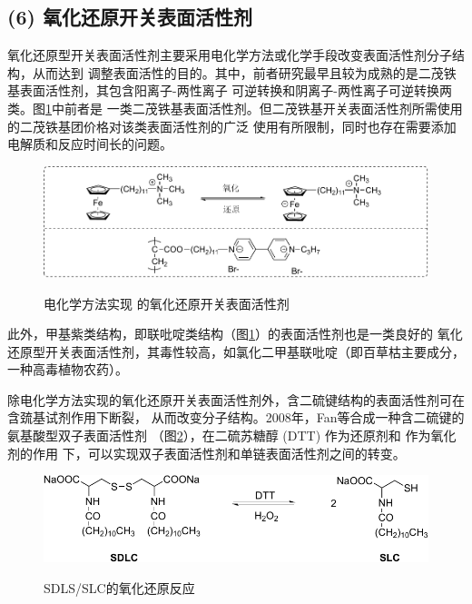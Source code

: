 \documentclass[bachelor,winfonts,replaceperiod]{jnuthesis}
\begin{document}
    \subsection*{(6) 氧化还原开关表面活性剂}
    氧化还原型开关表面活性剂主要采用电化学方法或化学手段改变表面活性剂分子结构，从而达到
    调整表面活性的目的。其中，前者研究最早且较为成熟的是二茂铁基表面活性剂，其包含阳离子-两性离子
    可逆转换和阴离子-两性离子可逆转换两类\cite{李云霞2011}。图\ref{fig:switchable-redox-cp2fe}中前者是
    一类二茂铁基表面活性剂。但二茂铁基开关表面活性剂所需使用的二茂铁基团价格对该类表面活性剂的广泛
    使用有所限制，同时也存在需要添加电解质和反应时间长的问题。
    \begin{figure}[htbp]
        \centering
        \includegraphics[scale=0.8]{Figure/switchable-cp2fe.pdf}\\
        \caption{电化学方法实现 的氧化还原开关表面活性剂}\label{fig:switchable-redox-cp2fe}
    \end{figure}
    
    此外，甲基紫类结构，即联吡啶类结构（图\ref{fig:switchable-redox-cp2fe}）的表面活性剂也是一类良好的
    氧化还原型开关表面活性剂，其毒性较高，如氯化二甲基联吡啶（即百草枯主要成分，一种高毒植物农药）。
    
    除电化学方法实现的氧化还原开关表面活性剂外，含二硫键结构的表面活性剂可在含巯基试剂作用下断裂，
    从而改变分子结构。2008年，Fan等\cite{fan2008}合成一种含二硫键的氨基酸型双子表面活性剂
    （图\ref{fig:switchable-redox-disulfide}），在二硫苏糖醇 (DTT) 作为还原剂和  作为氧化剂的作用
    下，可以实现双子表面活性剂和单链表面活性剂之间的转变。
    \begin{figure}[htbp]
        \centering
        \includegraphics[scale=0.8]{figure/switchable-disulfide.pdf}\\
        \caption{SDLS/SLC的氧化还原反应\cite{fan2008}}\label{fig:switchable-redox-disulfide}
    \end{figure}
    
\end{document}

